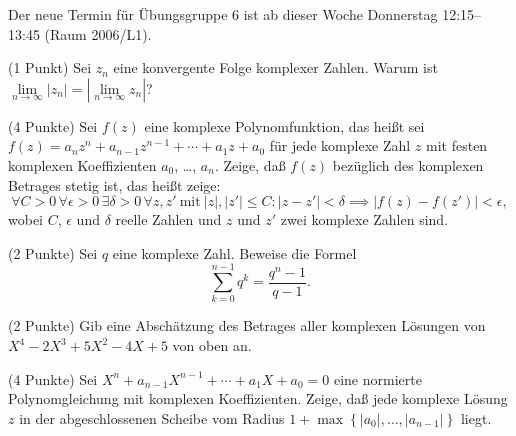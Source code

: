 \documentclass{algsheet}
\author{Dipl.-Math.~Franz Vogler}
\date{09.~November 2010}
\begin{document}
                \maketitle




Der neue Termin für Übungsgruppe 6 ist ab dieser Woche Donnerstag 12:15--13:45 (Raum 2006/L1).


\begin{exercise}(1 Punkt)\newline
    Sei \(z_n\) eine konvergente Folge komplexer Zahlen. Warum ist
    \(\lim\limits_{n \to \infty} |z_n|
    = |\lim\limits_{n \to \infty} z_n|\)?
\end{exercise}

\begin{exercise}(4 Punkte)\newline
   Sei \(f(z)\) eine komplexe Polynomfunktion, das heißt sei
    \(f(z) = a_n z^n + a_{n - 1} z^{n - 1} + \dotsb + a_1 z + a_0\) für jede
    komplexe Zahl \(z\) mit festen komplexen Koeffizienten \(a_0\), \dots, \(a_n\).
    Zeige, daß \(f(z)\) bezüglich des komplexen Betrages stetig ist, das heißt
    zeige: 
    \[
        \forall C > 0\, \forall \epsilon > 0\, \exists \delta > 0\,
        \forall z, z'\ \text{mit}\ |z|, |z'| \leq C\colon |z - z'| < \delta
        \implies |f(z) - f(z')| < \epsilon,
    \]
    wobei \(C\), \(\epsilon\) und \(\delta\) reelle Zahlen und \(z\) und \(z'\) zwei
    komplexe Zahlen sind.\end{exercise}

\begin{exercise}(2 Punkte)\newline
    Sei \(q\) eine komplexe Zahl. Beweise die Formel
    \[\sum_{k = 0}^{n - 1} q^k = \frac{q^n-1}{q-1}.\]
\end{exercise}

\begin{exercise}(2 Punkte)\newline
    Gib eine Abschätzung des Betrages aller komplexen Lösungen von
    \(X^4 - 2 X^3 + 5 X^2 - 4 X + 5\) von oben an.
\end{exercise}

\begin{exercise}(4 Punkte)\newline
    Sei \(X^n + a_{n - 1} X^{n - 1} + \dotsb + a_1 X + a_0=0\) eine normierte
    Polynomgleichung mit komplexen Koeffizienten. Zeige, daß jede komplexe
    Lösung \(z\) in der abgeschlossenen Scheibe vom Radius
    $1+\max\left\{|a_0|,\dotsc, |a_{n-1}|\right\}$ 
    liegt.

\end{exercise}
\end{document}
